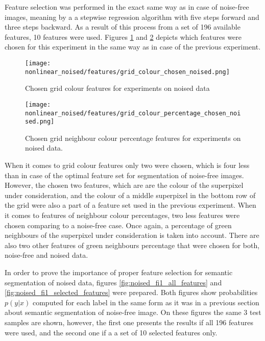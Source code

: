 Feature selection was performed in the exact same way as in case of noise-free images, meaning by a a stepwise regression algorithm with five steps forward and three steps backward. As a result of this process from a set of 196 available features, 10 features were used. Figures \ref{fig:nonlinear_noised_features_colour} and \ref{fig:nonlinear_noised_features_percentage} depicts which features were chosen for this experiment in the same way as in case of the previous experiment. 
\begin{figure}[ht]
    \centering
    \texttt{[image: nonlinear\_noised/features/grid\_colour\_chosen\_noised.png]}
    \caption{Chosen grid colour features for experiments on noised data}
    \label{fig:nonlinear_noised_features_colour}
\end{figure}
\begin{figure}[ht]
    \centering
    \texttt{[image: nonlinear\_noised/features/grid\_colour\_percentage\_chosen\_noised.png]}
    \caption{Chosen grid neighbour colour percentage features for experiments on noised data.}
    \label{fig:nonlinear_noised_features_percentage}
\end{figure}

When it comes to grid colour features only two were chosen, which is four less than in case of the optimal feature set for segmentation of noise-free images. However, the chosen two features, which are are the colour of the superpixel under consideration, and the colour of a middle superpixel in the bottom row of the grid were also a part of a feature set used in the previous experiment. When it comes to features of neighbour colour percentages, two less features were chosen comparing to a noise-free case. Once again, a percentage of green neighbours of the superpixel under consideration is taken into account. There are also two other features of green neighbours percentage that were chosen for both, noise-free and noised data. 

In order to prove the importance of proper feature selection for semantic segmentation of noised data, figures \ref{fig:noised_fi1_all_features} and \ref{fig:noised_fi1_selected_features} were prepared. Both figures show probabilities $p(y|x)$ computed for each label in the same form as it was in a previous section about semantic segmentation of noise-free image. On these figures the same 3 test samples are shown, however, the first one presents the results if all 196 features were used, and the second one if a a set of 10 selected features only. 

